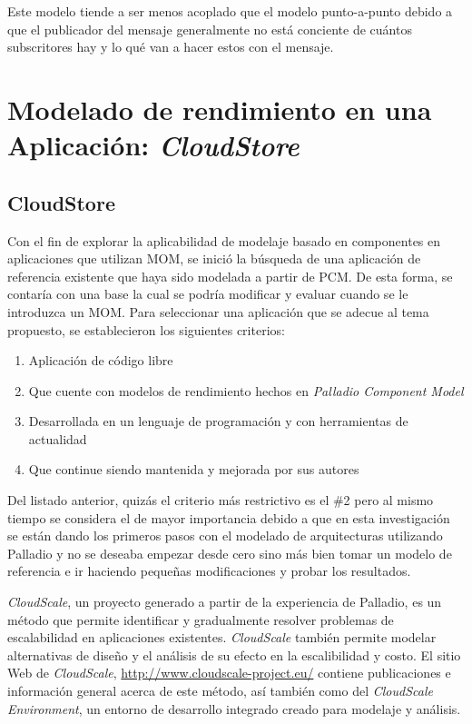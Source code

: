 \documentclass[conference]{IEEEtran}
\begin{document}
Este modelo tiende a ser menos acoplado que el modelo punto-a-punto debido a que el publicador del mensaje generalmente no está conciente de cuántos subscritores hay y lo qué van a hacer estos con el mensaje. 

\section{Modelado de rendimiento en una Aplicación: \emph{CloudStore}} \label{sec:cloudstore}

\subsection{CloudStore} 
Con el fin de explorar la aplicabilidad de modelaje basado en componentes en aplicaciones que utilizan MOM, se inició la búsqueda de una aplicación de referencia existente que haya sido modelada a partir de PCM. De esta forma, se contaría con una base la cual se podría modificar y evaluar cuando se le introduzca un MOM. Para seleccionar una aplicación que se adecue al tema propuesto, se establecieron los siguientes criterios:
\begin{enumerate}
    \item Aplicación de código libre
    \item Que cuente con modelos de rendimiento hechos en \emph{Palladio Component Model}
    \item Desarrollada en un lenguaje de programación y con herramientas de actualidad
    \item Que continue siendo mantenida y mejorada por sus autores
\end{enumerate}
Del listado anterior, quizás el criterio más restrictivo es el \#2 pero al mismo tiempo se considera el de mayor importancia debido a que en esta investigación se están dando los primeros pasos con el modelado de arquitecturas utilizando Palladio y no se deseaba empezar desde cero sino más bien tomar un modelo de referencia e ir haciendo pequeñas modificaciones y probar los resultados.

\emph{CloudScale}\cite{cloudscale-2}, un proyecto generado a partir de la experiencia de Palladio, es un método que permite identificar y gradualmente resolver problemas de escalabilidad en aplicaciones existentes. \emph{CloudScale} también permite modelar alternativas de diseño y el análisis de su efecto en la escalibilidad y costo\cite{cloudscale}. El sitio Web de \emph{CloudScale}, \url{http://www.cloudscale-project.eu/} contiene publicaciones e información general acerca de este método, así también como del \emph{CloudScale Environment}, un entorno de desarrollo integrado creado para modelaje y análisis. 
\end{document}
